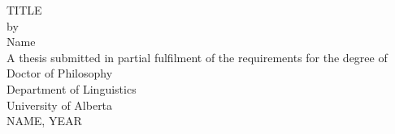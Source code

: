 \documentclass[12pt]{report}
\begin{document}
\lstset{style=mystyle}


\newcommand{\syl}[1]{#1}
\newfontfamily{}
\makeatletter
  \begingroup
    \tgtermes
  \endgroup
\sloppy
\thispagestyle{empty}
	\begin{center}
		\hfill \break 
		\hfill \break
		\hfill \break
		\hfill \break
TITLE\\
\hfill \break
by\\
\hfill \break
Name\\
\hfill \break
\hfill \break
\hfill \break
\hfill \break
\hfill \break
\hfill \break
A thesis submitted in partial fulfilment of the requirements for the degree of\\
\hfill \break
\hfill \break
Doctor of Philosophy\\
\hfill \break
\hfill \break
\hfill \break
\hfill \break
\hfill \break
\hfill \break
\hfill \break
\hfill \break
\hfill \break
\hfill \break
Department of Linguistics\\
University of Alberta\\
\hfill \break
\hfill \break
\hfill \break
\hfill \break
\hfill \break
\hfill \break
\hfill \break
\hfill \break
\hfill \break
\hfill \break
\hfill \break
\textcopyright \space NAME, YEAR\\
	\end{center}
\clearpage	
	

	\degree{\PhD}%
	
	
	
	
\end{document}
